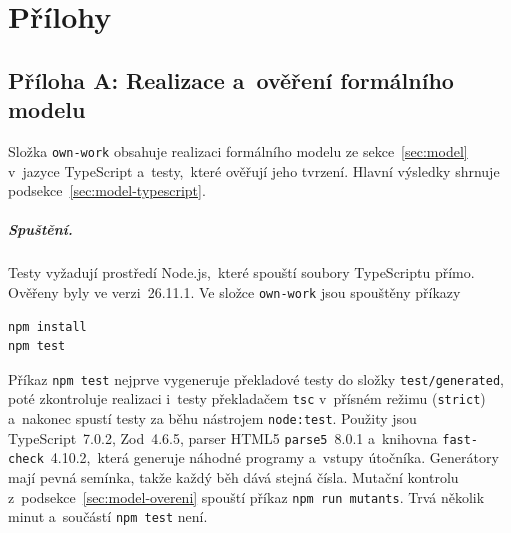 \chapter*{Přílohy}

\section*{Příloha A: Realizace a~ověření formálního modelu}
{}
\label{app:own-work}
\setlength{\emergencystretch}{3em}
\setcounter{table}{0}
\renewcommand{\thetable}{A.\arabic{table}}
\def\theHtable{A.\arabic{table}}

Složka \texttt{own-work} obsahuje realizaci formálního modelu ze sekce~\ref{sec:model} v~jazyce TypeScript a~testy,~které ověřují jeho tvrzení. Hlavní výsledky shrnuje podsekce~\ref{sec:model-typescript}.

\paragraph{Spuštění.}
Testy vyžadují prostředí Node.js,~které spouští soubory TypeScriptu přímo. Ověřeny byly ve verzi~26.11.1. Ve složce \texttt{own-work} jsou spouštěny příkazy
\begin{verbatim}
npm install
npm test
\end{verbatim}
\noindent
Příkaz \texttt{npm test} nejprve vygeneruje překladové testy do složky \texttt{test/generated}, poté zkontroluje realizaci i~testy překladačem \texttt{tsc} v~přísném režimu (\texttt{strict}) a~nakonec spustí testy za běhu nástrojem \texttt{node:test}. Použity jsou TypeScript~7.0.2, Zod~4.6.5, parser HTML5 \texttt{parse5}~8.0.1 a~knihovna \texttt{fast-check}~4.10.2,~která generuje náhodné programy a~vstupy útočníka. Generátory mají pevná semínka, takže každý běh dává stejná čísla. Mutační kontrolu z~podsekce~\ref{sec:model-overeni} spouští příkaz \texttt{npm run mutants}. Trvá několik minut a~součástí \texttt{npm test} není.

